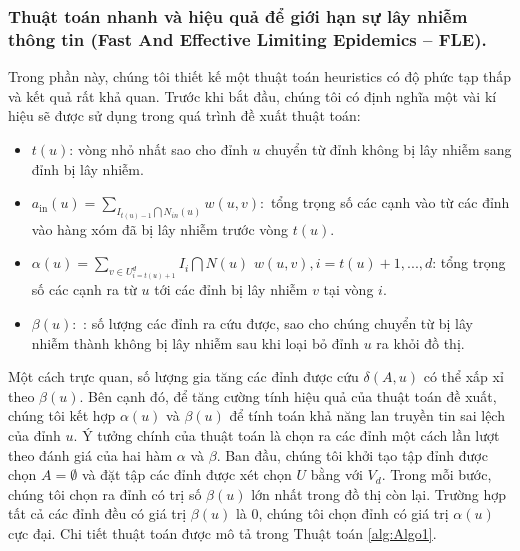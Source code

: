  	\subsubsection{Thuật toán nhanh và hiệu quả để giới hạn sự lây nhiễm thông tin (Fast And Effective Limiting Epidemics – FLE).}
 	Trong phần này, chúng tôi thiết kế một thuật toán heuristics có độ phức tạp thấp và kết quả rất khả quan. Trước khi bắt đầu, chúng tôi có định nghĩa một vài kí hiệu sẽ được sử dụng trong quá trình đề xuất thuật toán:
 	\begin {itemize}
 	\item $t(u)$: vòng nhỏ nhất sao cho đỉnh $u$ chuyển từ đỉnh không bị lây nhiễm sang đỉnh bị lây nhiễm.
 	
 	\item $a_{\text{in}}(u) = \sum_{I_{t(u) - 1} \bigcap N_{in}(u)} w(u,v):$ tổng trọng số các cạnh vào từ các đỉnh vào hàng xóm đã bị lây nhiễm trước vòng $t(u)$.
 	
 	\item $\alpha(u) = \sum_{v \in U^{d}_{i=t(u)+1}} I_{i} \bigcap N(u)$ $w(u,v), i = t(u) + 1, ... , d$: tổng trọng số các cạnh ra từ $u$ tới các đỉnh bị lây nhiễm $v$ tại vòng $i$.
 	
 	\item $\beta(u): $ : số lượng các đỉnh ra cứu được, sao cho chúng chuyển từ bị lây nhiễm thành không bị lây nhiễm sau khi loại bỏ đỉnh $u$ ra khỏi đồ thị.
 	\end {itemize}
 	Một cách trực quan, số lượng gia tăng các đỉnh được cứu $\delta(A, u)$ có thể xấp xỉ theo $\beta(u)$. Bên cạnh đó, để tăng cường tính hiệu quả của thuật toán đề xuất, chúng tôi kết hợp $\alpha(u)$ và $\beta(u)$ để tính toán khả năng lan truyền tin sai lệch của đỉnh $u$. Ý tưởng chính của thuật toán là chọn ra các đỉnh một cách lần lượt theo đánh giá của hai hàm $\alpha$ và $\beta$. Ban đầu, chúng tôi khởi tạo tập đỉnh được chọn $A=\emptyset$ và đặt tập các đỉnh được xét chọn $U$ bằng với $V_{d}$. Trong mỗi bước, chúng tôi chọn ra đỉnh có trị số $\beta(u)$ lớn nhất trong đồ thị còn lại. Trường hợp tất cả các đỉnh đều có giá trị $\beta(u)$ là 0, chúng tôi chọn đỉnh có giá trị $\alpha(u)$ cực đại. Chi tiết thuật toán được mô tả trong Thuật toán \ref{alg:Algo1}.
